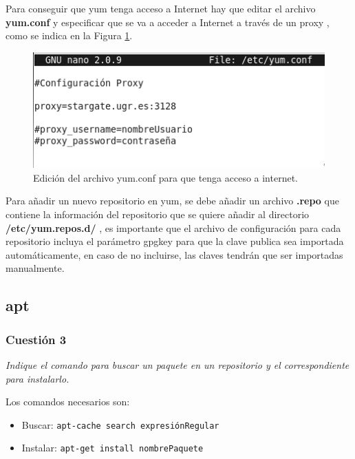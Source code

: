 Para conseguir que yum tenga acceso a Internet hay que editar el archivo \textbf{yum.conf} y especificar que se va a acceder a Internet a través de un proxy , como se indica en la Figura \ref{fig41}. \cite{centosproxy}

\begin{figure}[H]
    \begin{center}
        \includegraphics[scale=0.8]{imagenes/img44}
        \caption{Edición del archivo yum.conf para que tenga acceso a internet.}
        \label{fig41}
    \end{center}
\end{figure}


Para añadir un nuevo repositorio en yum, se debe añadir un archivo \textbf{.repo} que contiene la información del repositorio que se quiere añadir al directorio \textbf{/etc/yum.repos.d/} , es importante que el archivo de configuración para cada repositorio incluya el parámetro gpgkey para que la clave publica sea importada automáticamente, en caso de no incluirse, las claves tendrán que ser importadas manualmente. \cite{centosadd}
\subsection{apt}



\subsubsection{Cuestión 3}
\textit{Indique el comando para buscar un paquete en un repositorio y el correspondiente para instalarlo.}
\newline

Los comandos necesarios son: \cite{manapt1} \cite{manapt2}
\begin{itemize}
  \item Buscar: \texttt{apt-cache search expresiónRegular }
  \item Instalar: \texttt{apt-get install nombrePaquete}
\end{itemize}




